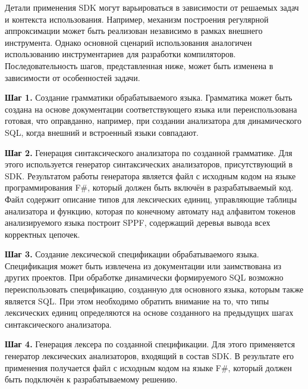 Детали применения SDK могут варьироваться в зависимости от решаемых задач и контекста использования. Например, механизм построения регулярной аппроксимации может быть реализован независимо в рамках внешнего инструмента. Однако основной сценарий использования аналогичен использованию инструментариев для разработки компиляторов. Последовательность шагов, представленная ниже, может быть изменена в зависимости от особенностей задачи.

\textbf{Шаг 1.} Создание грамматики обрабатываемого языка. Грамматика может быть создана на основе документации соответствующего языка или переиспользована готовая, что оправданно, например, при создании анализатора для динамического SQL, когда внешний и встроенный языки совпадают.

\textbf{Шаг 2.} Генерация синтаксического анализатора по созданной грамматике. Для этого используется генератор синтаксических анализаторов, присутствующий в SDK. Результатом работы генератора является файл с исходным кодом на языке программирования F\#, который должен быть включён в разрабатываемый код. Файл содержит описание типов для лексических единиц, управляющие таблицы анализатора и функцию, которая по конечному автомату над алфавитом токенов анализируемого языка построит SPPF, содержащий деревья вывода всех корректных цепочек.

\textbf{Шаг 3.} Создание лексической спецификации обрабатываемого языка. Спецификация может быть извлечена из документации или заимствована из других проектов. При обработке динамически формируемого SQL возможно переиспользовать спецификацию, созданную для основного языка, которым также является SQL. При этом необходимо обратить внимание на то, что типы лексических единиц определяются на основе созданного на предыдущих шагах синтаксического анализатора.

\textbf{Шаг 4.} Генерация лексера по созданной спецификации. Для этого применяется генератор лексических анализаторов, входящий в состав SDK. В результате его применения получается файл с исходным кодом на языке F\#, который должен быть подключён к разрабатываемому решению. 

